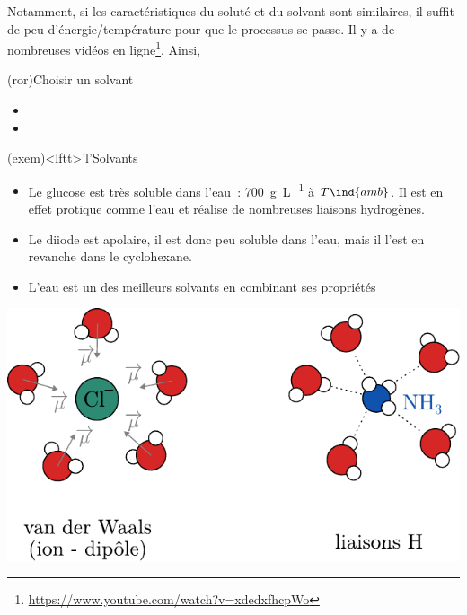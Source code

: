\documentclass[../../main/main.tex]{subfiles}
\begin{document}
Notamment, si les caractéristiques du soluté et du solvant sont similaires, il
suffit de peu d'énergie/température pour que le processus se passe. Il y a de
nombreuses vidéos en
ligne\footnote{\url{https://www.youtube.com/watch?v=xdedxfhcpWo}}. Ainsi,

\begin{tcb*}[sidebyside, righthand ratio=.4](ror){Choisir un solvant}
	\begin{itemize}
		\item
		\item
	\end{itemize}
	\tcblower
	\begin{center}
		\begin{bfseries}
		\end{bfseries}
	\end{center}
\end{tcb*}

\begin{tcb*}(exem)<lftt>'l'{Solvants}
	\begin{itemize}
		\item Le glucose est très soluble dans l'eau~: \SI{700}{g.L^{-1}} à
		      $T\ind{amb}$. Il est en effet protique comme l'eau et réalise de
		      nombreuses liaisons hydrogènes.
		\item Le diiode est apolaire, il est donc peu soluble dans l'eau, mais
		      il l'est en revanche dans le cyclohexane.
		\item L'eau est un des meilleurs solvants en combinant ses propriétés
	\end{itemize}
	\begin{center}
		\includegraphics[width=.6\linewidth]{sol_eau}
	\end{center}
\end{tcb*}
\end{document}
